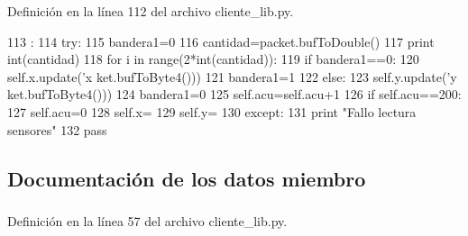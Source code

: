 Definición en la línea 112 del archivo cliente\_\-lib.py.


\begin{DoxyCode}
113                                         :
114                 try:
115                         bandera1=0
116                         cantidad=packet.bufToDouble()
117                         print int(cantidad)
118                         for i in range(2*int(cantidad)):
119                                 if bandera1==0:
120                                         self.x.update({'x%
      ket.bufToByte4())})
121                                         bandera1=1
122                                 else:
123                                         self.y.update({'y%
      ket.bufToByte4())})
124                                         bandera1=0
125                                         self.acu=self.acu+1
126                                 if self.acu==200:
127                                         self.acu=0
128                                         self.x={}
129                                         self.y={}
130                 except:
131                         print "Fallo lectura sensores"
132                         pass

\end{DoxyCode}


\subsection{Documentación de los datos miembro}
\hypertarget{classcliente__lib_1_1cliente__lib_a5b15a0be5d30abf1f71d776ccead9d9d}{
\subsubsection[{acu}]{}}
\label{classcliente__lib_1_1cliente__lib_a5b15a0be5d30abf1f71d776ccead9d9d}


Definición en la línea 57 del archivo cliente\_\-lib.py.

\hypertarget{classcliente__lib_1_1cliente__lib_a675dd8430aa2eeb33240b8b07ed61543}{
\subsubsection[{ip}]{}}
\label{classcliente__lib_1_1cliente__lib_a675dd8430aa2eeb33240b8b07ed61543}


